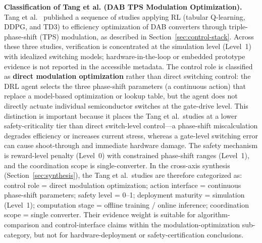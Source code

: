 \documentclass[manuscript,screen,review]{acmart}
\begin{document}
\medskip
\noindent\textbf{Classification of Tang et al. (DAB TPS Modulation Optimization).}
Tang et al.~\cite{tang2020reinforcement,tang2021deep,tang2022deep} published a sequence of studies applying RL (tabular Q-learning, DDPG, and TD3) to efficiency optimization of DAB converters through triple-phase-shift (TPS) modulation, as described in Section~\ref{sec:control-stack}.
Across these three studies, verification is concentrated at the simulation level (Level~1) with idealized switching models; hardware-in-the-loop or embedded prototype evidence is not reported in the accessible metadata.
The control role is classified as \textbf{direct modulation optimization} rather than direct switching control: the DRL agent selects the three phase-shift parameters (a continuous action) that replace a model-based optimization or lookup table, but the agent does not directly actuate individual semiconductor switches at the gate-drive level.
This distinction is important because it places the Tang et al.\ studies at a lower safety-criticality tier than direct switch-level control---a phase-shift miscalculation degrades efficiency or increases current stress, whereas a gate-level switching error can cause shoot-through and immediate hardware damage.
The safety mechanism is reward-level penalty (Level~0) with constrained phase-shift ranges (Level~1), and the coordination scope is single-converter.
In the cross-axis synthesis (Section~\ref{sec:synthesis}), the Tang et al.\ studies are therefore categorized as: control role = direct modulation optimization; action interface = continuous phase-shift parameters; safety level = 0--1; deployment maturity = simulation (Level~1); computation stage = offline training / online inference; coordination scope = single converter.
Their evidence weight is suitable for algorithm-comparison and control-interface claims within the modulation-optimization sub-category, but not for hardware-deployment or safety-certification conclusions.
\end{document}
